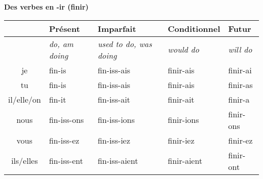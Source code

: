 \begin{comment}
\renewcommand{\stemFutur}{choisir}
\renewcommand{\stemPresent}{chois}
\begin{center}
\textbf{Des verbes en -ir (choisir)}
\vskip 0.1cm
\begin{tabular}{|c||L{3cm}|L{3cm}|L{3cm}|L{3cm}|}
\hline
& Pr\'esent & Imparfait & Conditionnel & Futur \\
\hline
& \textit{do, am doing} & \textit{used to do, was doing} & \textit{would do} & \textit{will do} \\
\hline\hline
je           &	\stemPresent-is 	&	\stemPresent-iss-ais	&	\stemFutur-ais	 &	\stemFutur-ai	\\
tu           &	\stemPresent-is	&	\stemPresent-iss-ais	&	\stemFutur-ais	&	\stemFutur-as	\\
il/elle/on &	\stemPresent-it	&	\stemPresent-iss-ait	&	\stemFutur-ait	&	\stemFutur-a	\\
nous      &	\stemPresent-issons	&	\stemPresent-iss-ions	&	\stemFutur-ions	&	\stemFutur-ons	\\
vous      &	\stemPresent-issez	&	\stemPresent-iss-iez	&	\stemFutur-iez		&	\stemFutur-ez	\\
ils/elles  &	\stemPresent-issent	&	\stemPresent-iss-aient	&	\stemFutur-aient	&	\stemFutur-ont	\\
\hline
\end{tabular}
\end{center}
\end{comment}

\vskip 0.5cm
\renewcommand{\stemPresent}{fin}
\renewcommand{\stemFutur}{finir}
\begin{center}
\textbf{Des verbes en -ir (finir)}
\vskip 0.1cm
\begin{tabular}{|c||L{3cm}|L{3cm}|L{3cm}|L{3cm}|}
\hline
& Pr\'esent & Imparfait & Conditionnel & Futur \\
\hline
& \textit{do, am doing} & \textit{used to do, was doing} & \textit{would do} & \textit{will do} \\
\hline\hline
je           &	\stemPresent-is 	&	\stemPresent-iss-ais	&	\stemFutur-ais	 &	\stemFutur-ai	\\
tu           &	\stemPresent-is	&	\stemPresent-iss-ais	&	\stemFutur-ais	&	\stemFutur-as	\\
il/elle/on &	\stemPresent-it	&	\stemPresent-iss-ait	&	\stemFutur-ait	&	\stemFutur-a	\\
nous      &	\stemPresent-iss-ons	&	\stemPresent-iss-ions	&	\stemFutur-ions	&	\stemFutur-ons	\\
vous      &	\stemPresent-iss-ez	&	\stemPresent-iss-iez	&	\stemFutur-iez		&	\stemFutur-ez	\\
ils/elles  &	\stemPresent-iss-ent	&	\stemPresent-iss-aient	&	\stemFutur-aient	&	\stemFutur-ont	\\
\hline
\end{tabular}
\end{center}

